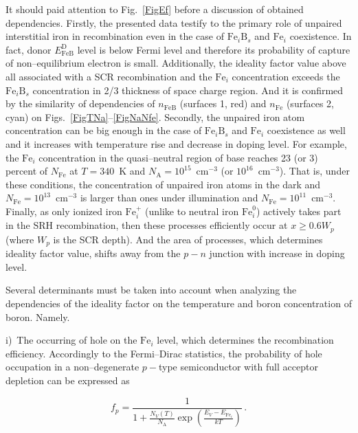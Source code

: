 \documentclass[12pt]{article}
\begin{document}
It should paid attention to Fig.~\ref{FigEf} before a discussion of obtained dependencies.
Firstly, the presented data testify to the primary role of unpaired interstitial iron in recombination
even in the case of $\mathrm{Fe}_i\mathrm{B}_s$ and $\mathrm{Fe}_i$ coexistence.
In fact, donor $E_{\mathrm{FeB}}^\mathrm{D}$ level is below Fermi level
and therefore its probability of capture of non--equilibrium electron is small.
Additionally, the ideality factor value above all associated with a SCR recombination
and the $\mathrm{Fe}_i$ concentration exceeds the $\mathrm{Fe}_i\mathrm{B}_s$ concentration in 2/3 thickness of space charge region.
And it is confirmed by the similarity of dependencies of $n_\mathrm{FeB}$ (surfaces 1, red) and $n_\mathrm{Fe}$ (surfaces 2, cyan)
on Figs.~\ref{FigTNa}--\ref{FigNaNfe}.
Secondly, the unpaired iron atom concentration can be big enough in the case of $\mathrm{Fe}_i\mathrm{B}_s$ and $\mathrm{Fe}_i$ coexistence as well
and it increases with temperature rise and decrease in doping level.
For example, the $\mathrm{Fe}_i$ concentration in the quasi--neutral region of base
reaches 23 (or 3) percent of $N_\mathrm{Fe}$ at $T=340$~K and $N_\mathrm{A}=10^{15}$~cm$^{-3}$ (or $10^{16}$~cm$^{-3}$).
That is, under these conditions, the concentration of unpaired iron atoms in the dark and $N_\mathrm{Fe}=10^{13}$~cm$^{-3}$ is larger
than ones under illumination and $N_\mathrm{Fe}=10^{11}$~cm$^{-3}$.
Finally,
as only ionized iron $\mathrm{Fe}_i^+$ (unlike to neutral iron $\mathrm{Fe}_i^0$) actively takes  part in the SRH recombination,
then these processes efficiently occur at $x\geq0.6W_p$ (where $W_p$ is the SCR depth).
And the area of processes, which determines ideality factor value,
shifts away from the $p-n$ junction with increase in doping level.

Several determinants must be taken into account when analyzing the dependencies of the ideality factor on the temperature and boron concentration of boron.
Namely.

i)~The occurring of hole on the $\mathrm{Fe}_i$ level, which determines the recombination efficiency.
Accordingly to the Fermi--Dirac statistics,
the probability of hole occupation in  a non--degenerate $p-$type semiconductor with full acceptor depletion
can be expressed as

\begin{equation}
\label{eqfp}
 f_p=\frac{1}{1+\frac{N_V(T)}{N_\mathrm{A}}\exp\left(\frac{E_V-E_{\mathrm{Fe}_i}}{kT}\right)}\,.
\end{equation}
\end{document}
